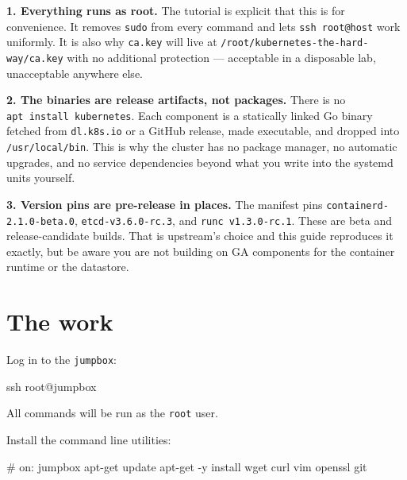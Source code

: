 \documentclass[11pt,oneside]{report}
\begin{document}
\textbf{1.
Everything runs as
root.} The tutorial
is explicit that
this is for
convenience. It
removes
\texttt{sudo} from
every command and
lets
\texttt{ssh\ root@host}
work uniformly. It
is also why
\texttt{ca.key} will
live at
\texttt{/}\allowbreak{}\texttt{root/}\allowbreak{}\texttt{kubernetes-}\allowbreak{}\texttt{the-}\allowbreak{}\texttt{hard-}\allowbreak{}\texttt{way/}\allowbreak{}\texttt{ca.}\allowbreak{}\texttt{key}
with no additional
protection ---
acceptable in a
disposable lab,
unacceptable
anywhere else.

\textbf{2. The
binaries are release
artifacts, not
packages.} There is
no
\texttt{apt\ install\ kubernetes}.
Each component is a
statically linked Go
binary fetched from
\texttt{dl.k8s.io}
or a GitHub release,
made executable, and
dropped into
\texttt{/usr/local/bin}.
This is why the
cluster has no
package manager, no
automatic upgrades,
and no service
dependencies beyond
what you write into
the systemd units
yourself.

\textbf{3. Version
pins are pre-release
in places.} The
manifest pins
\texttt{containerd-}\allowbreak{}\texttt{2.}\allowbreak{}\texttt{1.}\allowbreak{}\texttt{0-}\allowbreak{}\texttt{beta.}\allowbreak{}\texttt{0},
\texttt{etcd-}\allowbreak{}\texttt{v3.}\allowbreak{}\texttt{6.}\allowbreak{}\texttt{0-}\allowbreak{}\texttt{rc.}\allowbreak{}\texttt{3},
and
\texttt{runc\ v1.}\allowbreak{}\texttt{3.}\allowbreak{}\texttt{0-}\allowbreak{}\texttt{rc.}\allowbreak{}\texttt{1}.
These are beta and
release-candidate
builds. That is
upstream's choice
and this guide
reproduces it
exactly, but be
aware you are not
building on GA
components for the
container runtime or
the datastore.

\hypertarget{the-work-1}{%
\section{The
work}\label{the-work-1}}

Log in to the
\texttt{jumpbox}:

\begin{cmdlst}
ssh root@jumpbox
\end{cmdlst}

All commands will be
run as the
\texttt{root} user.

Install the command
line utilities:

\begin{cmdlst}
# on: jumpbox
{
  apt-get update
  apt-get -y install wget curl vim openssl git
}
\end{cmdlst}
\end{document}
